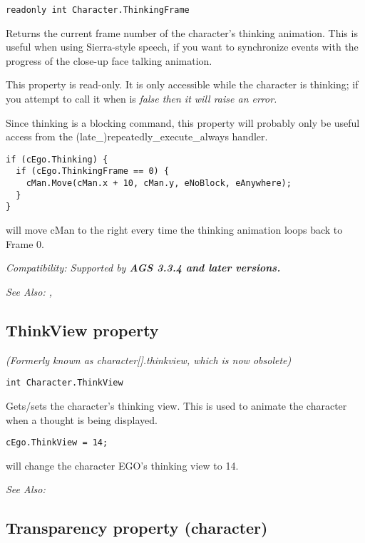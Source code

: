 \begin{verbatim}
readonly int Character.ThinkingFrame
\end{verbatim}
Returns the current frame number of the character's thinking animation. This is
useful when using Sierra-style speech, if you want to synchronize events with the
progress of the close-up face talking animation.

This property is read-only. It is only accessible while the character is thinking;
if you attempt to call it when  is
\it{false} then it will raise an error.

Since thinking is a blocking command, this property will probably only be useful
access from the (late_)repeatedly_execute_always handler.

\begin{verbatim}
if (cEgo.Thinking) {
  if (cEgo.ThinkingFrame == 0) {
    cMan.Move(cMan.x + 10, cMan.y, eNoBlock, eAnywhere);
  }
}
\end{verbatim}
will move cMan to the right every time the thinking animation loops back to Frame 0.

\it{Compatibility:} Supported by \bf{AGS 3.3.4} and later versions.

\it{See Also:} ,


\subsection{ThinkView property}\label{Character.ThinkView}%

\it{(Formerly known as character[].thinkview, which is now obsolete)}

\begin{verbatim}
int Character.ThinkView
\end{verbatim}
Gets/sets the character's thinking view. This is used to animate the character
when a thought is being displayed.

\begin{verbatim}
cEgo.ThinkView = 14;
\end{verbatim}
will change the character EGO's thinking view to 14.

\it{See Also:} 


\subsection{Transparency property (character)}\label{Character.Transparency}%

